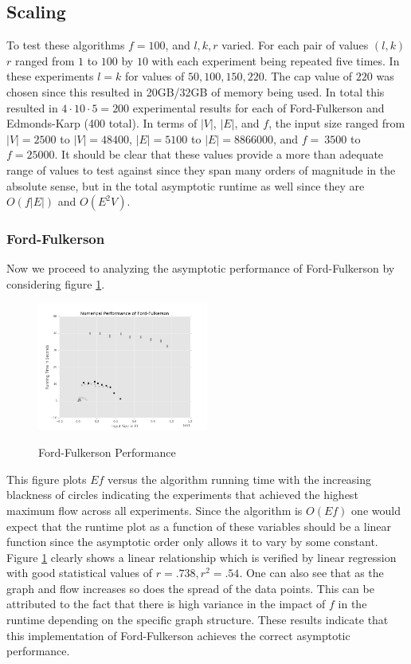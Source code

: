 \documentclass{article}
\begin{document}
\subsection{Scaling}
To test these algorithms $f=100$, and $l,k,r$ varied. For each pair of values $(l,k)$ $r$ ranged from $1$ to $100$ by $10$ with each experiment being repeated five times. In these experiments $l=k$ for values of $50,100,150,220$. The cap value of $220$ was chosen since this resulted in 20GB/32GB of memory being used. In total this resulted in $4\cdot 10\cdot 5=200$ experimental results for each of Ford-Fulkerson and Edmonds-Karp (400 total). In terms of $|V|$, $|E|$, and $f$, the input size ranged from $|V|=2500$ to $|V|=48400$, $|E|=5100$ to $|E|=8866000$, and $f=~3500$ to $f=25000$. It should be clear that these values provide a more than adequate range of values to test against since they span many orders of magnitude in the absolute sense, but in the total asymptotic runtime as well since they are $O(f|E|)$ and $O(E^2V)$.

\subsubsection{Ford-Fulkerson}
Now we proceed to analyzing the asymptotic performance of Ford-Fulkerson by considering figure \ref{ff-performance}.

\begin{figure}[!ht]
	\caption{Ford-Fulkerson Performance}
	\centering
	\includegraphics[width=0.5\textwidth]{images/ff-performance.png}
	\label{ff-performance}
\end{figure}

This figure plots $Ef$ versus the algorithm running time with the increasing blackness of circles indicating the experiments that achieved the highest maximum flow across all experiments. Since the algorithm is $O(Ef)$ one would expect that the runtime plot as a function of these variables should be a linear function since the asymptotic order only allows it to vary by some constant. Figure \ref{ff-performance} clearly shows a linear relationship which is verified by linear regression with good statistical values of $r=.738,r^2=.54$. One can also see that as the graph and flow increases so does the spread of the data points. This can be attributed to the fact that there is high variance in the impact of $f$ in the runtime depending on the specific graph structure. These results indicate that this implementation of Ford-Fulkerson achieves the correct asymptotic performance.
\end{document}
